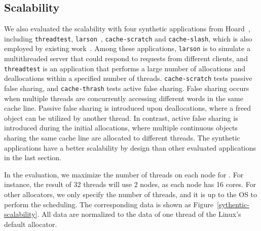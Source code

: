 \subsection{Scalability}
\label{sec:scale}

We also evaluated the scalability with four synthetic applications from Hoard~\cite{Hoard}, including \texttt{threadtest}, \texttt{larson}~\cite{Larson}, \texttt{cache-scratch} and \texttt{cache-slash}, which is also employed by existing work~\cite{Scalloc}. Among these applications, \texttt{larson} is to simulate a multithreaded server that could respond to requests from different clients, and \texttt{threadtest} is an application that performs a large number of allocations and deallocations within a specified number of threads. \texttt{cache-scratch} tests passive false sharing, and \texttt{cache-thrash} tests active false sharing. False sharing occurs when multiple threads are concurrently accessing different words in the same cache line. Passive false sharing is introduced upon deallocations, where a freed object can be utilized by another thread. In contrast, active false sharing is introduced during the initial allocations, where multiple continuous objects sharing the same cache line are allocated to different threads. The synthetic applications have a better scalability by design than other evaluated applications in the last section. 

In the evaluation, we maximize the number of threads on each node for \NM{}. For instance, the result of 32 threads will use 2 nodes, as each node has 16 cores. For other allocators, we only specify the number of threads, and it is up to the OS to perform the scheduling. The corresponding data is shown as Figure~\ref{sythentic-scalability}. All data are normalized to the data of one thread of the Linux's default allocator. 

